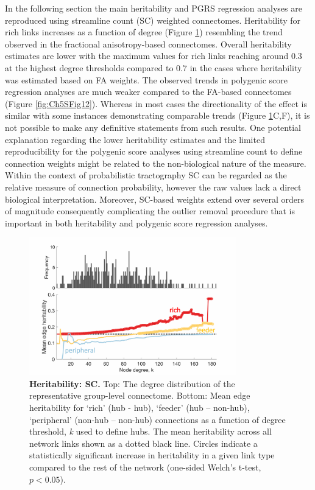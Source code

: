 \clearpage
In the following section the main heritability and PGRS regression analyses are reproduced using streamline count (SC) weighted connectomes. Heritability for rich links increases as a function of degree (Figure \ref{fig:Ch5SFig11}) resembling the trend observed in the fractional anisotropy-based connectomes. Overall heritability estimates are lower with the maximum values for rich links reaching around $0.3$ at the highest degree thresholds compared to $0.7$ in the cases where heritability was estimated based on FA weights. The observed trends in polygenic score regression analyses are much weaker compared to the FA-based connectomes (Figure \ref{fig:Ch5SFig12}). Whereas in most cases the directionality of the effect is similar with some instances demonstrating comparable trends (Figure \ref{fig:Ch5SFig11}C,F), it is not possible to make any definitive statements from such results. One potential explanation regarding the lower heritability estimates and the limited reproducibility for the polygenic score analyses using streamline count to define connection weights might be related to the non-biological nature of the measure. Within the context of probabilistic tractography SC can be regarded as the relative measure of connection probability, however the raw values lack a direct biological interpretation. Moreover, SC-based weights extend over several orders of magnitude consequently complicating the outlier removal procedure that is important in both heritability and polygenic score regression analyses. 

\begin{figure}[h!]
\begin{center}
\includegraphics[width=0.8\textwidth]{Chapter5/SFigure11.pdf}%
\end{center}
\caption{\textbf{Heritability: SC.} 
Top: The degree distribution of the representative group-level connectome. Bottom: Mean edge heritability for `rich' (hub - hub), `feeder' (hub – non-hub), `peripheral' (non-hub – non-hub) connections as a function of degree threshold, \textit{k} used to define hubs. The mean heritability across all network links shown as a dotted black line. Circles indicate a statistically significant increase in heritability in a given link type compared to the rest of the network (one-sided Welch's t-test, $p < 0.05$). }
\label{fig:Ch5SFig11}
\end{figure}

